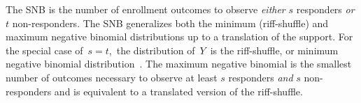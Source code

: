 \documentclass[review]{elsarticle}
\begin{document}
The SNB is the 
number of enrollment outcomes to observe {\em either} $s$ responders {\em or} 
$t$ non-responders.
The SNB generalizes both the minimum (riff-shuffle) and maximum negative
binomial distributions up to a translation of the support.
For the special case of $\,s=t,$ the distribution of $\,Y\,$ is the
riff-shuffle, or minimum negative binomial distribution~\citep{Uppuluri1970}.
The maximum negative binomial \cite{Zhang2000,Zelterman2005} is the smallest 
number of outcomes necessary to 
observe at least $s$ responders {\em and} $s$ non-responders and is equivalent
to a translated version of the riff-shuffle. 

\end{document}
